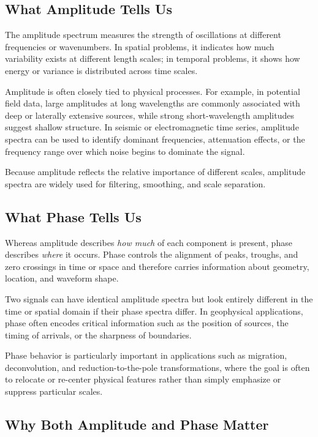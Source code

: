 \subsection{What Amplitude Tells Us}

The amplitude spectrum measures the strength of oscillations at different frequencies or wavenumbers. In spatial problems, it indicates how much variability exists at different length scales; in temporal problems, it shows how energy or variance is distributed across time scales.

Amplitude is often closely tied to physical processes. For example, in potential field data, large amplitudes at long wavelengths are commonly associated with deep or laterally extensive sources, while strong short-wavelength amplitudes suggest shallow structure. In seismic or electromagnetic time series, amplitude spectra can be used to identify dominant frequencies, attenuation effects, or the frequency range over which noise begins to dominate the signal.

Because amplitude reflects the relative importance of different scales, amplitude spectra are widely used for filtering, smoothing, and scale separation.

\subsection{What Phase Tells Us}

Whereas amplitude describes \emph{how much} of each component is present, phase describes \emph{where} it occurs. Phase controls the alignment of peaks, troughs, and zero crossings in time or space and therefore carries information about geometry, location, and waveform shape.

Two signals can have identical amplitude spectra but look entirely different in the time or spatial domain if their phase spectra differ. In geophysical applications, phase often encodes critical information such as the position of sources, the timing of arrivals, or the sharpness of boundaries.

Phase behavior is particularly important in applications such as migration, deconvolution, and reduction-to-the-pole transformations, where the goal is often to relocate or re-center physical features rather than simply emphasize or suppress particular scales.

\subsection{Why Both Amplitude and Phase Matter}

